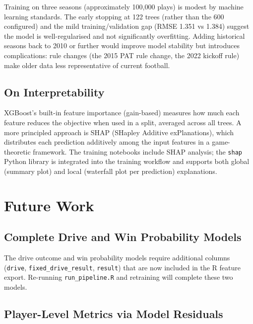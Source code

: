 \documentclass[11pt]{article}
\begin{document}
Training on three seasons (approximately 100,000 plays) is modest by machine
learning standards. The early stopping at 122 trees (rather than the 600
configured) and the mild training/validation gap (RMSE 1.351 vs 1.384) suggest
the model is well-regularised and not significantly overfitting. Adding
historical seasons back to 2010 or further would improve model stability but
introduces complications: rule changes (the 2015 PAT rule change, the 2022
kickoff rule) make older data less representative of current football.

\subsection{On Interpretability}

XGBoost's built-in feature importance (gain-based) measures how much each
feature reduces the objective when used in a split, averaged across all trees.
A more principled approach is SHAP (SHapley Additive exPlanations), which
distributes each prediction additively among the input features in a game-theoretic
framework. The training notebooks include SHAP analysis; the \texttt{shap}
Python library is integrated into the training workflow and supports both
global (summary plot) and local (waterfall plot per prediction) explanations.

\section{Future Work}
\label{sec:future}

\subsection{Complete Drive and Win Probability Models}

The drive outcome and win probability models require additional columns
(\texttt{drive}, \texttt{fixed\_drive\_result}, \texttt{result}) that are now
included in the R feature export. Re-running \texttt{run\_pipeline.R} and
retraining will complete these two models.

\subsection{Player-Level Metrics via Model Residuals}
\end{document}
